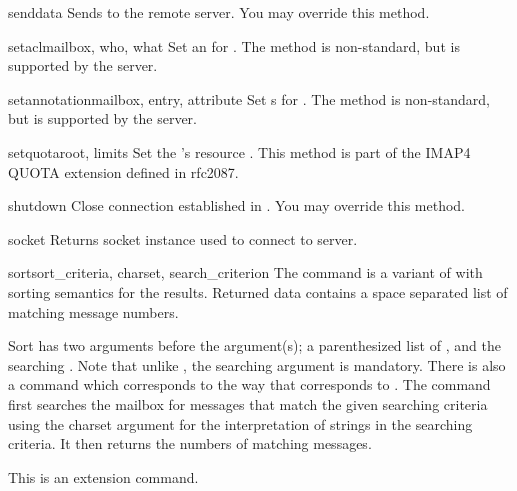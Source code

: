 \begin{methoddesc}{send}{data}
  Sends  to the remote server.
  You may override this method.
\end{methoddesc}

\begin{methoddesc}{setacl}{mailbox, who, what}
  Set an  for .
  The method is non-standard, but is supported by the  server.
\end{methoddesc}

\begin{methoddesc}{setannotation}{mailbox, entry, attribute}
  Set s for .
  The method is non-standard, but is supported by the  server.
\end{methoddesc}

\begin{methoddesc}{setquota}{root, limits}
  Set the  's resource .
  This method is part of the IMAP4 QUOTA extension defined in rfc2087.
\end{methoddesc}

\begin{methoddesc}{shutdown}{}
  Close connection established in .
  You may override this method.
\end{methoddesc}

\begin{methoddesc}{socket}{}
  Returns socket instance used to connect to server.
\end{methoddesc}

\begin{methoddesc}{sort}{sort_criteria, charset, search_criterion}
  The  command is a variant of  with sorting
  semantics for the results.  Returned data contains a space separated
  list of matching message numbers.

  Sort has two arguments before the 
  argument(s); a parenthesized list of , and the
  searching .  Note that unlike , the
  searching  argument is mandatory.  There is also a
   command which corresponds to  the way
  that  corresponds to .  The
   command first searches the mailbox for messages that
  match the given searching criteria using the charset argument for
  the interpretation of strings in the searching criteria.  It then
  returns the numbers of matching messages.

  This is an  extension command.
\end{methoddesc}


